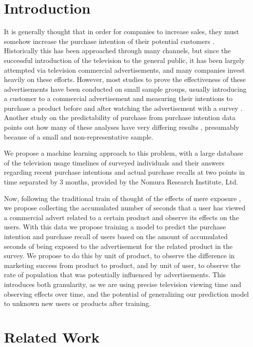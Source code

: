 \documentclass[review]{elsarticle}
\begin{document}
\linenumbers

\section{Introduction}
\label{intro}

It is generally thought that in order for companies to increase sales, they must somehow increase the purchase intention of their potential customers \cite{2}. Historically this has been approached through many channels, but since the successful introduction of the television to the general public, it has been largely attempted via television commercial advertisements, and many companies invest heavily on these efforts. However, most studies to prove the effectiveness of these advertisements have been conducted on small sample groups, usually introducing a customer to a commercial advertisement and measuring their intentions to purchase a product before and after watching the advertisement with a survey \cite[e.g.][]{3}. Another study on the predictability of purchase from purchase intention data points out how many of these analyses have very differing results \cite{2}, presumably because of a small and non-representative sample.

We propose a machine learning approach to this problem, with a large database of the television usage timelines of surveyed individuals and their answers regarding recent purchase intentions and actual purchase recalls at two points in time separated by 3 months, provided by the Nomura Research Institute, Ltd.

Now, following the traditional train of thought of the effects of mere exposure \cite{10}, we propose collecting the accumulated number of seconds that a user has viewed a commercial advert related to a certain product and observe its effects on the users. With this data we propose training a model to predict the purchase intention and purchase recall of users based on the amount of accumulated seconds of being exposed to the advertisement for the related product in the survey. We propose to do this by unit of product, to observe the difference in marketing success from product to product, and by unit of user, to observe the rate of population that was potentially influenced by advertisements. This introduces both granularity, as we are using precise television viewing time and observing effects over time, and the potential of generalizing our prediction model to unknown new users or products after training.

\section{Related Work}
\label{related}
\end{document}
